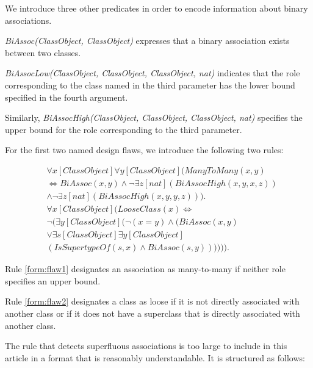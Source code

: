 \documentclass[conference]{IEEEtran}
\begin{document}
We introduce three other predicates in order to encode information about binary associations.

\textit{BiAssoc(ClassObject, ClassObject)} expresses that a binary association exists between two classes.

\textit{BiAssocLow(ClassObject, ClassObject, ClassObject, nat)} indicates that the role corresponding to the class named in the third parameter has the lower bound specified in the fourth argument.

Similarly, \textit{BiAssocHigh(ClassObject, ClassObject, ClassObject, nat)} specifies the upper bound for the role corresponding to the third parameter.

For the first two named design flaws, we introduce the following two rules:

\begin{align}
	\nonumber &\forall{x}[ClassObject]\forall{y}[ClassObject](ManyToMany(x, y) \\ \nonumber &\Leftrightarrow BiAssoc(x, y) \land \lnot \exists{z}[nat](BiAssocHigh(x, y, x, z)) \\ &\land \lnot \exists{z}[nat](BiAssocHigh(x, y, y, z))).\label{form:flaw1} \\
	\nonumber &\forall{x}[ClassObject](LooseClass(x) \Leftrightarrow \\ \nonumber &\lnot (\exists{y}[ClassObject](\lnot(x = y) \land (BiAssoc(x, y) \\ \nonumber  &\lor \exists{s}[ClassObject]\exists{y}[ClassObject]\\ &(IsSupertypeOf(s, x) \land BiAssoc(s, y)))))).\label{form:flaw2}
\end{align}

Rule \ref{form:flaw1} designates an association as many-to-many if neither role specifies an upper bound.

Rule \ref{form:flaw2} designates a class as loose if it is not directly associated with another class or if it does not have a superclass that is directly associated with another class.

The rule that detects superfluous associations is too large to include in this article in a format that is reasonably understandable. It is structured as follows:
\end{document}
